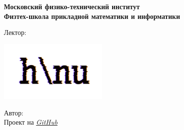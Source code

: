 \begin{titlepage}
	\clearpage\thispagestyle{empty}
	\centering

	\textbf{Московский физико-технический институт \\ Физтех-школа прикладной математики и информатики}
	\vspace{33ex}

	{\textbf{\FullCourseNameFirstPart}}

	\SemesterNumber
	\vspace{1ex}

	Лектор: \textit{\LecturerInitials}

	\includegraphics[width=0.4\textwidth]{images/logo_ltc.pdf}

	\begin{flushright}
		\noindent
		Автор: \href{\TGLink}{\textit{\AuthorInitials}}
		\\
		Проект на \href{\GitHubLink}{\textit{GitHub}}
	\end{flushright}

	\vfill
	\CourseDate
	\pagebreak
\end{titlepage}
